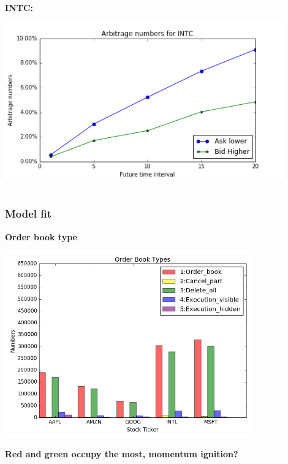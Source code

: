 \documentclass[xcolor={x11names,svgnames,dvipsnames}]{beamer}
\begin{document}
\begin{frame}
\begin{columns}
\begin{column}{.5\textwidth}
			 \textbf{INTC:}
	
										\includegraphics[width=0.9\textwidth, height=0.35\textheight]{INTC_arbitrage_time.png}

		\end{column}
	\end{columns}

\end{frame}



\begin{frame}
\frametitle{Model fit}
\textbf{Order book type}

\begin{center}	
\includegraphics[width=0.8\textwidth, height=0.6\textheight]{order_book_type.png}
\end{center}
\textbf{Red and green occupy the most, momentum ignition?}
\end{frame}
\end{document}
